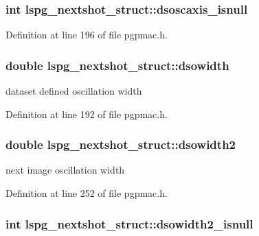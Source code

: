 \hypertarget{structlspg__nextshot__struct_a51a26391afcacfb4c946fb9e8e9ab6b0}{
\subsubsection[{dsoscaxis\-\_\-isnull}]{\setlength{\rightskip}{0pt plus 5cm}int lspg\-\_\-nextshot\-\_\-struct\-::dsoscaxis\-\_\-isnull}}\label{structlspg__nextshot__struct_a51a26391afcacfb4c946fb9e8e9ab6b0}


Definition at line 196 of file pgpmac.\-h.

\hypertarget{structlspg__nextshot__struct_ad5a8f568a04aa6a13767933062b28f19}{
\subsubsection[{dsowidth}]{\setlength{\rightskip}{0pt plus 5cm}double lspg\-\_\-nextshot\-\_\-struct\-::dsowidth}}\label{structlspg__nextshot__struct_ad5a8f568a04aa6a13767933062b28f19}


dataset defined oscillation width 



Definition at line 192 of file pgpmac.\-h.

\hypertarget{structlspg__nextshot__struct_a5378e13735a5392a9fcd853ce8c9e929}{
\subsubsection[{dsowidth2}]{\setlength{\rightskip}{0pt plus 5cm}double lspg\-\_\-nextshot\-\_\-struct\-::dsowidth2}}\label{structlspg__nextshot__struct_a5378e13735a5392a9fcd853ce8c9e929}


next image oscillation width 



Definition at line 252 of file pgpmac.\-h.

\hypertarget{structlspg__nextshot__struct_a5ffd27b8063506fd54162658e5c2ce8a}{
\subsubsection[{dsowidth2\-\_\-isnull}]{\setlength{\rightskip}{0pt plus 5cm}int lspg\-\_\-nextshot\-\_\-struct\-::dsowidth2\-\_\-isnull}}\label{structlspg__nextshot__struct_a5ffd27b8063506fd54162658e5c2ce8a}


